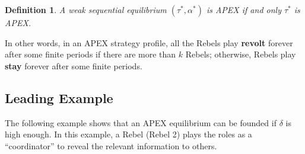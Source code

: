 \documentclass[12pt,letter]{article}
\newtheorem{definition}{Definition}[section]
\theoremstyle{definition}
\theoremstyle{remark}
\theoremstyle{claim}
\begin{document}
\begin{definition}\label{Def_expost_efficient}
A weak sequential equilibrium $(\tau^{*},\alpha^{*})$ is APEX if and only $\tau^{*}$ is APEX.
\end{definition}




In other words, in an APEX strategy profile, all the Rebels play \textbf{revolt} forever after some finite periods if there are more than $k$ Rebels; otherwise, Rebels play \textbf{stay} forever after some finite periods. 


 \subsection{Leading Example}


The following example shows that an APEX equilibrium can be founded if $\delta$ is high enough. In this example, a Rebel (Rebel 2) plays the roles as a ``coordinator'' to reveal the relevant information to others.
\end{document}
